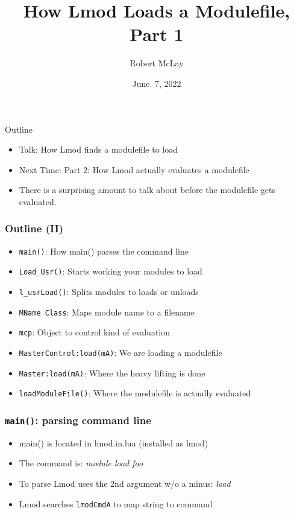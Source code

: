 \documentclass{beamer}
\begin{document}
\title[Lmod]{How Lmod Loads a Modulefile, Part 1}
\author{Robert McLay} 
\date{June. 7, 2022}

\frame{\titlepage} 


\begin{frame}{Outline}
  \begin{itemize}
    \item Talk: How Lmod finds a modulefile to load
    \item Next Time: Part 2: How Lmod actually evaluates a modulefile
    \item There is a surprising amount to talk about before the
      modulefile gets evaluated.
  \end{itemize}
\end{frame}

\begin{frame}[fragile]
    \frametitle{Outline (II)}
  \begin{itemize}
    \item \texttt{main()}: How main() parses the command line
    \item \texttt{Load\_Usr()}: Starts working your modules to load
    \item \texttt{l\_usrLoad()}: Splits modules to loads or unloads
    \item \texttt{MName Class}: Maps module name to a filename
    \item \texttt{mcp}: Object to control kind of evaluation
    \item \texttt{MasterControl:load(mA)}: We are loading a modulefile
    \item \texttt{Master:load(mA)}: Where the heavy lifting is done
    \item \texttt{loadModuleFile()}: Where the modulefile is actually evaluated
  \end{itemize}
\end{frame}

\begin{frame}[fragile]
    \frametitle{\texttt{main()}: parsing command line}
  \begin{itemize}
    \item main() is located in lmod.in.lua (installed as lmod)
    \item The command is: {\color{blue}\emph{module load foo}}
    \item To parse Lmod uses the 2nd argument w/o a minus: {\color{blue}\emph{load}}
    \item Lmod searches \texttt{lmodCmdA} to map string to command
  \end{itemize}
\end{frame}
\end{document}
